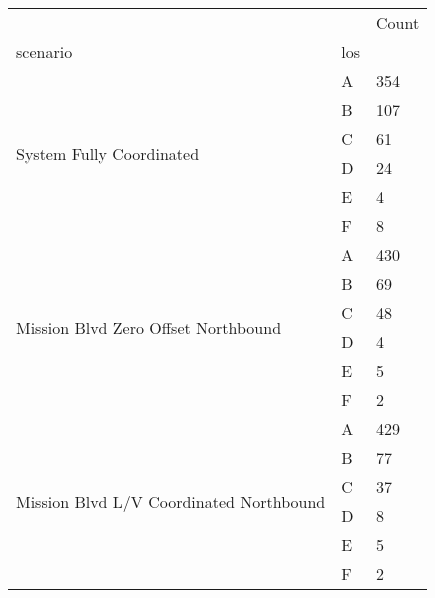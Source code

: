 \begin{tabular}{lll}
\toprule
 &  & Count \\
scenario & los &  \\
\midrule
\multirow[t]{6}{*}{System Fully Coordinated} & A & 354 \\
 & B & 107 \\
 & C & 61 \\
 & D & 24 \\
 & E & 4 \\
 & F & 8 \\
\multirow[t]{6}{*}{Mission Blvd Zero Offset Northbound} & A & 430 \\
 & B & 69 \\
 & C & 48 \\
 & D & 4 \\
 & E & 5 \\
 & F & 2 \\
\multirow[t]{6}{*}{Mission Blvd L/V Coordinated Northbound} & A & 429 \\
 & B & 77 \\
 & C & 37 \\
 & D & 8 \\
 & E & 5 \\
 & F & 2 \\
\bottomrule
\end{tabular}
